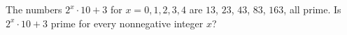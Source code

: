 The numbers $2^x\cdot10+3$ for $x=0,1,2,3,4$ are $13$, $23$, $43$, $83$, $163$, all prime. Is $2^x\cdot10+3$ prime for every nonnegative integer $x$?
